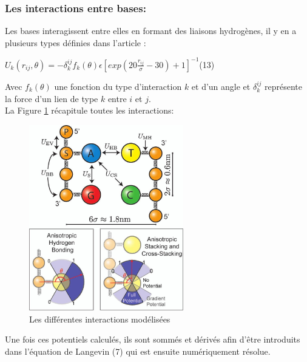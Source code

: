 \documentclass[a4paper,11pt]{article}
\begin{document}
\subsubsection*{Les interactions entre bases:}

Les bases interagissent entre elles en formant des liaisons hydrogènes, il y en a plusieurs types définies dans l'article \cite{jchem}:

\begin{center}
$U_{k}(r_{ij},\theta)= -\delta_k^{ij} f_k (\theta) \epsilon[exp(20 \frac{r_{ij}}{\sigma} - 30)+1]^{-1}$\flushright(13)
\end{center}

Avec $f_k (\theta)$ une fonction du type d'interaction $k$ et d'un angle et $\delta_k^{ij}$ représente la force d'un lien de type $k$ entre $i$ et $j$.\\



La Figure \ref{moldyn} récapitule toutes les interactions:

\begin{figure}[H]
\begin{center}
\includegraphics[width=0.6\textwidth]{moldyn.jpg}

\caption{Les différentes interactions modélisées}
\label{moldyn}
\end{center}
\end{figure}

Une fois ces potentiels calculés, ils sont sommés et dérivés afin d'être introduits dans l'équation de Langevin (7) qui est ensuite numériquement résolue.


\newpage 
\end{document}
